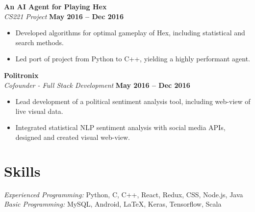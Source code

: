\documentclass[margin,line]{resume}
\begin{document}
\begin{resume}
    \textbf{An AI Agent for Playing Hex} \vspace{1mm}\\\vspace{1mm}%
    \textsl{CS221 Project} \hfill \textbf{May 2016 -- Dec 2016}
    \begin{itemize}
        \item Developed algorithms for optimal gameplay of Hex, including statistical and search methods.
        \item Led port of project from Python to C++, yielding a highly performant agent.
    \end{itemize}

    \textbf{Politronix} \vspace{1mm}\\\vspace{1mm}%
    \textsl{Cofounder - Full Stack Development} \hfill \textbf{May 2016 -- Dec 2016}
    \begin{itemize}
        \item Lead development of a political sentiment analysis tool, including web-view of live visual data.
        \item Integrated statistical NLP sentiment analysis with social media APIs, designed and created visual web-view.
    \end{itemize}

    \section{\mysidestyle Skills}

    \emph{Experienced Programming:} Python, C, C++, React, Redux, CSS, Node.js, Java \\
    \emph{Basic Programming:} MySQL, Android, \LaTeX, Keras, Tensorflow, Scala
\end{resume}
\end{document}
